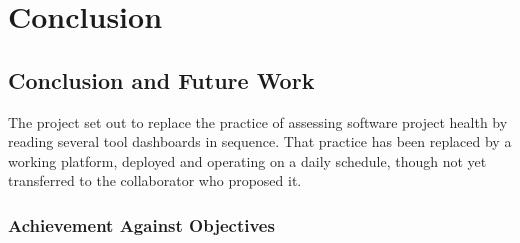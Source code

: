 





\chapter{Conclusion}
\label{ch:conclusion}

\section{Conclusion and Future Work}
\label{sec:conclusion}

The project set out to replace the practice of assessing software project health
by reading several tool dashboards in sequence. That practice has been replaced
by a working platform, deployed and operating on a daily schedule, though not yet
transferred to the collaborator who proposed it.

\subsection{Achievement Against Objectives}
\label{subsec:objective-achievement}

